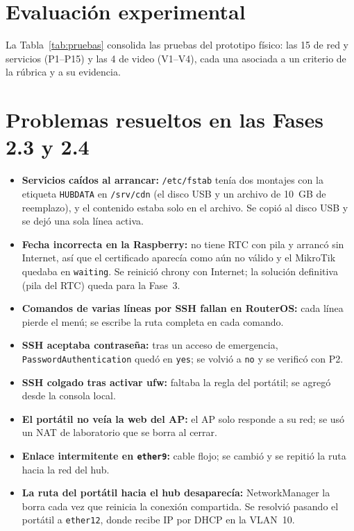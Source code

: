 \documentclass[conference]{IEEEtran}
\begin{document}
\section{Evaluación experimental}
La Tabla~\ref{tab:pruebas} consolida las pruebas del prototipo físico: las 15 de red y servicios (P1--P15) y las 4 de video (V1--V4), cada una asociada a un criterio de la rúbrica y a su evidencia.


\section{Problemas resueltos en las Fases 2.3 y 2.4}
\begin{itemize}
\item \textbf{Servicios caídos al arrancar:} \texttt{/etc/fstab} tenía dos montajes con la etiqueta \texttt{HUBDATA} en \texttt{/srv/cdn} (el disco USB y un archivo de 10~GB de reemplazo), y el contenido estaba solo en el archivo. Se copió al disco USB y se dejó una sola línea activa.
\item \textbf{Fecha incorrecta en la Raspberry:} no tiene RTC con pila y arrancó sin Internet, así que el certificado aparecía como aún no válido y el MikroTik quedaba en \texttt{waiting}. Se reinició chrony con Internet; la solución definitiva (pila del RTC) queda para la Fase~3.
\item \textbf{Comandos de varias líneas por SSH fallan en RouterOS:} cada línea pierde el menú; se escribe la ruta completa en cada comando.
\item \textbf{SSH aceptaba contraseña:} tras un acceso de emergencia, \texttt{PasswordAuthentication} quedó en \texttt{yes}; se volvió a \texttt{no} y se verificó con P2.
\item \textbf{SSH colgado tras activar ufw:} faltaba la regla del portátil; se agregó desde la consola local.
\item \textbf{El portátil no veía la web del AP:} el AP solo responde a su red; se usó un NAT de laboratorio que se borra al cerrar.
\item \textbf{Enlace intermitente en \texttt{ether9}:} cable flojo; se cambió y se repitió la ruta hacia la red del hub.
\item \textbf{La ruta del portátil hacia el hub desaparecía:} NetworkManager la borra cada vez que reinicia la conexión compartida. Se resolvió pasando el portátil a \texttt{ether12}, donde recibe IP por DHCP en la VLAN~10.

\end{itemize}
\end{document}
